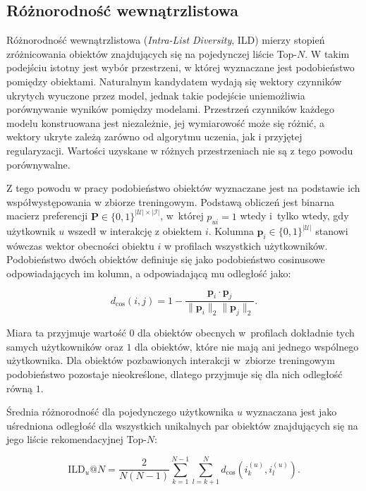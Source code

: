 \subsection{Różnorodność wewnątrzlistowa}

Różnorodność wewnątrzlistowa (\textit{Intra-List Diversity}, ILD) mierzy stopień zróżnicowania obiektów znajdujących się na pojedynczej liście Top-$N$. W takim podejściu istotny jest wybór przestrzeni, w której wyznaczane jest podobieństwo pomiędzy obiektami. Naturalnym kandydatem wydają się wektory czynników ukrytych wyuczone przez model, jednak takie podejście uniemożliwia porównywanie wyników pomiędzy modelami. Przestrzeń czynników każdego modelu konstruowana jest niezależnie, jej wymiarowość może się różnić, a wektory ukryte zależą zarówno od algorytmu uczenia, jak i przyjętej regularyzacji. Wartości uzyskane w różnych przestrzeniach nie są z tego powodu porównywalne.

Z tego powodu w pracy podobieństwo obiektów wyznaczane jest na podstawie ich współwystępowania w zbiorze treningowym. Podstawą obliczeń jest binarna macierz preferencji $\mathbf{P} \in \{0, 1\}^{|\mathcal{U}| \times |\mathcal{I}|}$, w~której $p_{ui} = 1$ wtedy i~tylko wtedy, gdy użytkownik $u$ wszedł w interakcję z obiektem $i$. Kolumna $\mathbf{p}_i \in \{0,1\}^{|\mathcal{U}|}$ stanowi wówczas wektor obecności obiektu $i$ w profilach wszystkich użytkowników. Podobieństwo dwóch obiektów definiuje się jako podobieństwo cosinusowe odpowiadających im kolumn, a odpowiadającą mu odległość jako:

\begin{equation}
    d_{\text{cos}}(i, j) = 1 - \frac{\mathbf{p}_i \cdot \mathbf{p}_j}{\|\mathbf{p}_i\|_2 \|\mathbf{p}_j\|_2}.
\end{equation}

Miara ta przyjmuje wartość $0$ dla obiektów obecnych w~profilach dokładnie tych samych użytkowników oraz $1$ dla obiektów, które nie mają ani jednego wspólnego użytkownika. Dla obiektów pozbawionych interakcji w~zbiorze treningowym podobieństwo pozostaje nieokreślone, dlatego przyjmuje się dla nich odległość równą $1$.

Średnia różnorodność dla pojedynczego użytkownika $u$ wyznaczana jest jako uśredniona odległość dla wszystkich unikalnych par obiektów znajdujących się na jego liście rekomendacyjnej Top-$N$:

\begin{equation}
    \label{eq:ild_u}
    \text{ILD}_u@N = \frac{2}{N(N - 1)} \sum_{k=1}^{N-1} \sum_{l=k+1}^{N} d_{\text{cos}}\left( i_k^{(u)}, i_l^{(u)} \right).
\end{equation}

